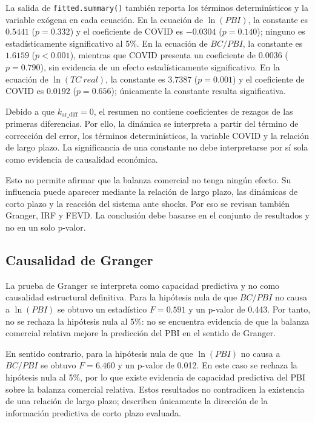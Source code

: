\documentclass[12pt,a4paper]{article}
\begin{document}
La salida de \texttt{fitted.summary()} también reporta los términos determinísticos
y la variable exógena en cada ecuación. En la ecuación de $\ln(PBI)$, la
constante es $0.5441$ ($p=0.332$) y el coeficiente de COVID es $-0.0304$
($p=0.140$); ninguno es estadísticamente significativo al 5\%. En la
ecuación de $BC/PBI$, la constante es $1.6159$ ($p<0.001$), mientras que
COVID presenta un coeficiente de $0.0036$ ($p=0.790$), sin evidencia de un
efecto estadísticamente significativo. En la ecuación de $\ln(TC\ real)$,
la constante es $3.7387$ ($p=0.001$) y el coeficiente de COVID es $0.0192$
($p=0.656$); únicamente la constante resulta significativa.

Debido a que $k_{\mathrm{ar\_diff}}=0$, el resumen no contiene coeficientes
de rezagos de las primeras diferencias. Por ello, la dinámica se interpreta
a partir del término de corrección del error, los términos determinísticos,
la variable COVID y la relación de largo plazo. La significancia de una
constante no debe interpretarse por sí sola como evidencia de causalidad
económica.

Esto no permite afirmar que la balanza comercial no tenga ningún efecto. Su
influencia puede aparecer mediante la relación de largo plazo, las dinámicas
de corto plazo y la reacción del sistema ante shocks. Por eso se revisan
también Granger, IRF y FEVD. La conclusión debe basarse en el conjunto de
resultados y no en un solo p-valor.

\subsection{Causalidad de Granger}

La prueba de Granger se interpreta como capacidad predictiva y no como
causalidad estructural definitiva. Para la hipótesis nula de que $BC/PBI$ no
causa a $\ln(PBI)$ se obtuvo un estadístico $F=0.591$ y un p-valor de
0.443. Por tanto, no se rechaza la hipótesis nula al 5\%: no se encuentra
evidencia de que la balanza comercial relativa mejore la predicción del PBI
en el sentido de Granger.

En sentido contrario, para la hipótesis nula de que $\ln(PBI)$ no causa a
$BC/PBI$ se obtuvo $F=6.460$ y un p-valor de 0.012. En este caso se rechaza
la hipótesis nula al 5\%, por lo que existe evidencia de capacidad predictiva
del PBI sobre la balanza comercial relativa. Estos resultados no contradicen
la existencia de una relación de largo plazo; describen únicamente la
dirección de la información predictiva de corto plazo evaluada.
\end{document}
